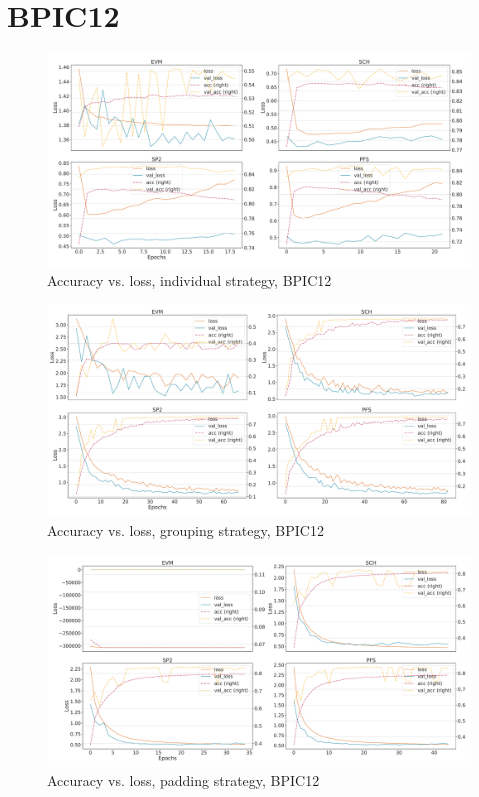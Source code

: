 \section*{BPIC12}
\begin{figure}[!htb]
    \centering
    \includegraphics[width=\textwidth]{gfx/bpic2012/individual_loss_acc_curve.pdf}
    \caption{Accuracy vs. loss, individual strategy, BPIC12}
\end{figure}
\begin{figure}[!htb]
    \centering
    \includegraphics[width=\textwidth]{gfx/bpic2012/grouped_loss_acc_curve.pdf}
    \caption{Accuracy vs. loss, grouping strategy, BPIC12}
\end{figure}
\begin{figure}[!htb]
    \centering
    \includegraphics[width=\textwidth]{gfx/bpic2012/padded_loss_acc_curve.pdf}
    \caption{Accuracy vs. loss, padding strategy, BPIC12}
\end{figure}
